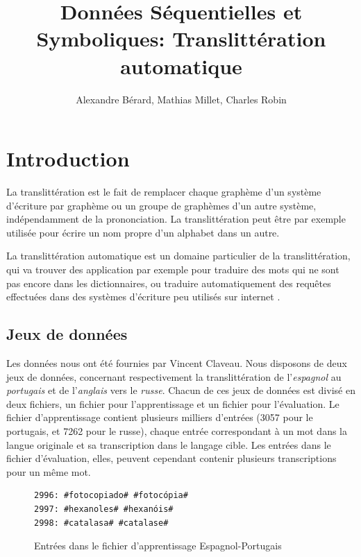 \documentclass{article}
\begin{document}
\title{Données Séquentielles et Symboliques: Translittération automatique}

\author{Alexandre Bérard, Mathias Millet, Charles Robin}
\maketitle
\begin{abstract}
\end{abstract}
\vspace{0.5em}
\section{Introduction}

La translittération est le fait de remplacer chaque graphème d'un système d'écriture par graphème ou un groupe de graphèmes d'un autre système, indépendamment de la prononciation. La translittération peut être par exemple utilisée pour écrire un nom propre d'un alphabet dans un autre. 

La translittération automatique est un domaine particulier de la translittération, qui va trouver des application par exemple pour traduire des mots qui ne sont pas encore dans les dictionnaires, ou traduire automatiquement des requêtes effectuées dans des systèmes d'écriture peu utilisés sur internet \cite{Singh2010}.


\subsection{Jeux de données}
Les données nous ont été fournies par Vincent Claveau. Nous disposons de deux jeux de données, concernant respectivement la translittération de l'\emph{espagnol} au \emph{portugais} et de l'\emph{anglais} vers le \emph{russe}. Chacun de ces jeux de données est divisé en deux fichiers, un fichier pour l'apprentissage et un fichier pour l'évaluation. Le fichier d'apprentissage contient plusieurs milliers d'entrées (3057 pour le portugais, et 7262 pour le russe), chaque entrée correspondant à un mot dans la langue originale et sa transcription dans le langage cible. Les entrées dans le fichier d'évaluation, elles, peuvent cependant contenir plusieurs transcriptions pour un même mot. 


\begin{figure}[H]
\caption{Entrées dans le fichier d'apprentissage Espagnol-Portugais}
\begin{verbatim}
2996: #fotocopiado# #fotocópia#
2997: #hexanoles# #hexanóis#
2998: #catalasa# #catalase#
\end{verbatim}
\end{figure}
\end{document}

